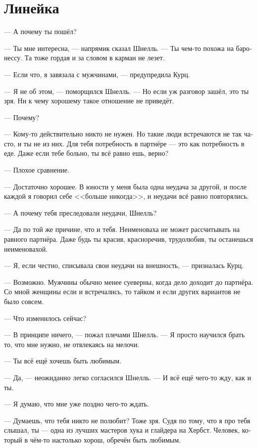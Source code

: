 \documentclass[a4paper,10pt,fleqn]{book}\usepackage{polyglossia}\setdefaultlanguage[babelshorthands=true]{russian}\setotherlanguage{english}\defaultfontfeatures{Ligatures=TeX,Mapping=tex-text}\usepackage{xcolor}\newcommand{\ml}[3]{#2}
\begin{document}
\section{Линейка}

--- А почему ты пошёл?

--- Ты мне интересна, --- напрямик сказал Шнелль.
--- Ты чем-то похожа на баронессу.
Та тоже гордая и за словом в карман не лезет.

--- Если что, я завязала с мужчинами, --- предупредила Курц.

--- Я не об этом, --- поморщился Шнелль.
--- Но если уж разговор зашёл, это ты зря.
Ни к чему хорошему такое отношение не приведёт.

--- Почему?

--- Кому-то действительно никто не нужен.
Но такие люди встречаются не так часто, и ты не из них.
Для тебя потребность в партнёре --- это как потребность в еде.
Даже если тебе больно, ты всё равно ешь, верно?

--- Плохое сравнение.

--- Достаточно хорошее.
В юности у меня была одна неудача за другой, и после каждой я говорил себе <<больше никогда>>, и неудачи всё равно повторялись.

--- А почему тебя преследовали неудачи, Шнелль?

--- Да по той же причине, что и тебя.
Неименоваха не может рассчитывать на равного партнёра.
Даже будь ты красив, красноречив, трудолюбив, ты останешься неименовахой.

--- Я, если честно, списывала свои неудачи на внешность, --- призналась Курц.

--- Возможно.
Мужчины обычно менее суеверны, когда дело доходит до партнёра.
Со мной женщины если и встречались, то тайком и если других вариантов не было совсем.

--- Что изменилось сейчас?

--- В принципе ничего, --- пожал плечами Шнелль.
--- Я просто научился брать то, что мне нужно, не отвлекаясь на мелочи.

--- Ты всё ещё хочешь быть любимым.

--- Да, --- неожиданно легко согласился Шнелль.
--- И всё ещё чего-то жду, как и ты.

--- Я думаю, что мне уже поздно чего-то ждать.

--- Думаешь, что тебя никто не полюбит?
Тоже зря.
Судя по тому, что я про тебя слышал, ты --- одна из лучших мастеров хука и глайдера на Хербст.
Человек, который в чём-то настолько хорош, обречён быть любимым.
\end{document}
